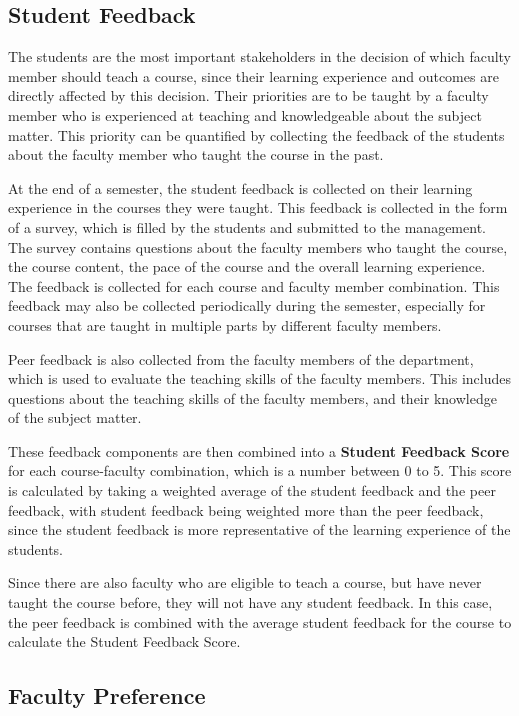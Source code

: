 \subsection{Student Feedback}

The students are the most important stakeholders in the decision of which faculty member should teach a course, since their learning experience and outcomes are directly affected by this decision. Their priorities are to be taught by a faculty member who is experienced at teaching and knowledgeable about the subject matter. This priority can be quantified by collecting the feedback of the students about the faculty member who taught the course in the past.

At the end of a semester, the student feedback is collected on their learning experience in the courses they were taught. This feedback is collected in the form of a survey, which is filled by the students and submitted to the management. The survey contains questions about the faculty members who taught the course, the course content, the pace of the course and the overall learning experience. The feedback is collected for each course and faculty member combination. This feedback may also be collected periodically during the semester, especially for courses that are taught in multiple parts by different faculty members.

Peer feedback is also collected from the faculty members of the department, which is used to evaluate the teaching skills of the faculty members. This includes questions about the teaching skills of the faculty members, and their knowledge of the subject matter.

These feedback components are then combined into a \textbf{Student Feedback Score} for each course-faculty combination, which is a number between 0 to 5. This score is calculated by taking a weighted average of the student feedback and the peer feedback, with student feedback being weighted more than the peer feedback, since the student feedback is more representative of the learning experience of the students.

Since there are also faculty who are eligible to teach a course, but have never taught the course before, they will not have any student feedback. In this case, the peer feedback is combined with the average student feedback for the course to calculate the Student Feedback Score.

\subsection{Faculty Preference}

